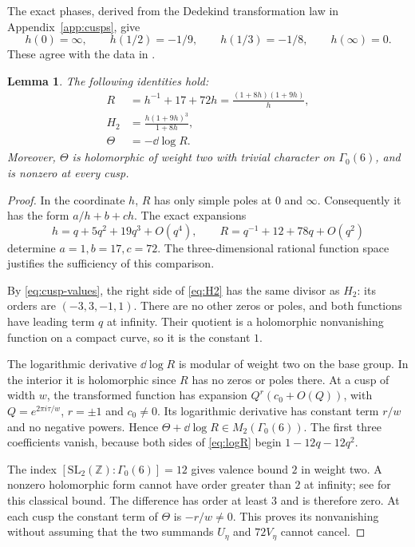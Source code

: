 \documentclass[11pt,a4paper]{article}
\newtheorem{lemma}[theorem]{Lemma}
\theoremstyle{remark}
\newcommand{\Z}{\mathbb Z}\newcommand{\Q}{\mathbb Q}
\begin{document}
The exact phases, derived from the Dedekind transformation law in
Appendix~\ref{app:cusps}, give
\begin{equation}\label{eq:cusp-values}
 h(0)=\infty,\qquad h(1/2)=-1/9,\qquad
 h(1/3)=-1/8,\qquad h(\infty)=0.
\end{equation}
These agree with the data in \cite[Section~8.10]{beukers}.

\begin{lemma}\label{lem:eta-identities}
The following identities hold:
\begin{align}
 R&=h^{-1}+17+72h=\frac{(1+8h)(1+9h)}h,\label{eq:R}\\
 H_2&=\frac{h(1+9h)^3}{1+8h},\label{eq:H2}\\
 \Theta&=-\dd\log R.\label{eq:logR}
\end{align}
Moreover, $\Theta$ is holomorphic of weight two with trivial
character on $\Gamma_0(6)$, and is nonzero at every cusp.
\end{lemma}
\begin{proof}
In the coordinate $h$, $R$ has only simple poles at $0$ and $\infty$.
Consequently it has the form $a/h+b+ch$. The exact expansions
\[
 h=q+5q^2+19q^3+O(q^4),\qquad
 R=q^{-1}+12+78q+O(q^2)
\]
determine $a=1,b=17,c=72$. The three-dimensional rational function
space justifies the sufficiency of this comparison.

By \eqref{eq:cusp-values}, the right side of \eqref{eq:H2} has
the same divisor as $H_2$: its orders are $(-3,3,-1,1)$.
There are no other zeros or poles, and both functions have leading
term $q$ at infinity. Their quotient is a holomorphic nonvanishing
function on a compact curve, so it is the constant $1$.

The logarithmic derivative $\dd\log R$ is modular of weight two
on the base group. In the interior it is holomorphic since $R$
has no zeros or poles there. At a cusp of width $w$, the transformed
function has expansion $Q^r(c_0+O(Q))$, with
$Q=e^{2\pi i\tau/w}$, $r=\pm1$ and $c_0\ne0$.
Its logarithmic derivative has constant term $r/w$ and no negative
powers. Hence $\Theta+\dd\log R\in M_2(\Gamma_0(6))$.
The first three coefficients vanish, because both sides of
\eqref{eq:logR} begin $1-12q-12q^2$.

The index $[\mathrm{SL}_2(\Z):\Gamma_0(6)]=12$ gives valence bound
$2$ in weight two. A nonzero holomorphic form cannot have order
greater than $2$ at infinity; see
\cite[p.~2, Theorem~1.1(1)]{craig} for this classical bound.
The difference has order at least $3$ and is therefore zero.
At each cusp the constant term of $\Theta$ is $-r/w\ne0$.
This proves its nonvanishing without assuming that the two summands
$U_\eta$ and $72V_\eta$ cannot cancel.
\end{proof}
\end{document}
